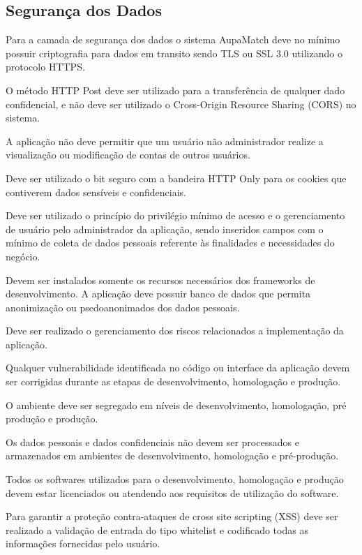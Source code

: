 \subsection{Segurança dos Dados}

Para a camada de segurança dos dados o sistema AupaMatch deve no mínimo possuir criptografia para dados em transito sendo \gls{TLS} ou \gls{SSL} 3.0 utilizando o protocolo \gls{HTTPS}.

O método \gls{HTTP} Post deve ser utilizado para a transferência de qualquer dado confidencial, e não deve ser utilizado o \gls{Cross-Origin Resource Sharing (CORS)} no sistema.

A aplicação não deve permitir que um usuário não administrador realize a visualização ou modificação de contas de outros usuários.

Deve ser utilizado o bit seguro com a bandeira \gls{HTTP Only} para os \gls{cookies} que contiverem dados sensíveis e confidenciais.

Deve ser utilizado o princípio do privilégio mínimo de acesso e o gerenciamento de usuário pelo administrador da aplicação, sendo inseridos campos com o mínimo de coleta de dados pessoais referente às finalidades e necessidades do negócio.

Devem ser instalados somente os recursos necessários dos \gls{frameworks} de desenvolvimento.
A aplicação deve possuir banco de dados que permita anonimização ou psedoanonimados dos dados pessoais.

Deve ser realizado o gerenciamento dos riscos relacionados a implementação da aplicação.

Qualquer vulnerabilidade identificada no código ou interface da aplicação devem ser corrigidas durante as etapas de desenvolvimento, homologação e produção.

O ambiente deve ser segregado em níveis de desenvolvimento, homologação, pré produção e produção.

Os dados pessoais e dados confidenciais não devem ser processados e armazenados em ambientes de desenvolvimento, homologação e pré-produção.

Todos os softwares utilizados para o desenvolvimento, homologação e produção devem estar licenciados ou atendendo aos requisitos de utilização do software.

Para garantir a proteção contra-ataques de \gls{cross site scripting (XSS)} deve ser realizado a validação de entrada do tipo \gls{whitelist} e codificado todas as informações fornecidas pelo usuário.